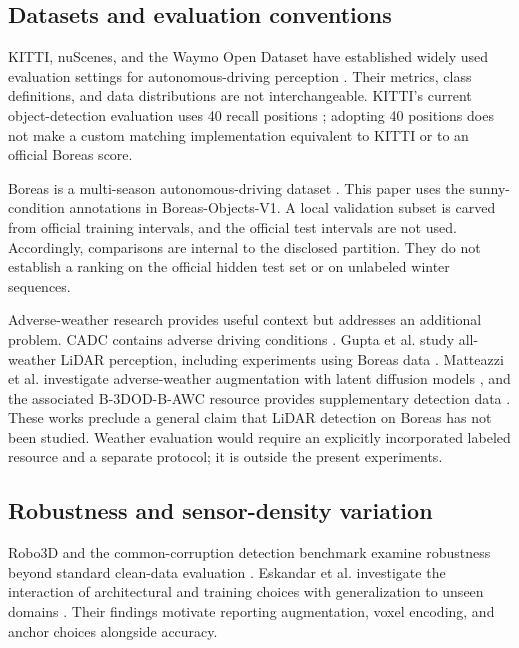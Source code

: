 \documentclass[10pt,twocolumn]{article}
\begin{document}
\subsection{Datasets and evaluation conventions}
KITTI, nuScenes, and the Waymo Open Dataset have established widely used evaluation settings for autonomous-driving perception \cite{geiger2012kitti,caesar2020nuscenes,sun2020waymo}. Their metrics, class definitions, and data distributions are not interchangeable. KITTI's current object-detection evaluation uses 40 recall positions \cite{kitti_eval}; adopting 40 positions does not make a custom matching implementation equivalent to KITTI or to an official Boreas score.

Boreas is a multi-season autonomous-driving dataset \cite{burnett2023boreas}. This paper uses the sunny-condition annotations in Boreas-Objects-V1. A local validation subset is carved from official training intervals, and the official test intervals are not used. Accordingly, comparisons are internal to the disclosed partition. They do not establish a ranking on the official hidden test set or on unlabeled winter sequences.

Adverse-weather research provides useful context but addresses an additional problem. CADC contains adverse driving conditions \cite{pitropov2021cadc}. Gupta et al. study all-weather LiDAR perception, including experiments using Boreas data \cite{gupta2025allweather}. Matteazzi et al. investigate adverse-weather augmentation with latent diffusion models \cite{matteazzi2026augmentation}, and the associated B-3DOD-B-AWC resource provides supplementary detection data \cite{boreas_awc}. These works preclude a general claim that LiDAR detection on Boreas has not been studied. Weather evaluation would require an explicitly incorporated labeled resource and a separate protocol; it is outside the present experiments.

\subsection{Robustness and sensor-density variation}
Robo3D and the common-corruption detection benchmark examine robustness beyond standard clean-data evaluation \cite{kong2023robo3d,dong2023corruptions}. Eskandar et al. investigate the interaction of architectural and training choices with generalization to unseen domains \cite{eskandar2024generalization}. Their findings motivate reporting augmentation, voxel encoding, and anchor choices alongside accuracy.
\end{document}
